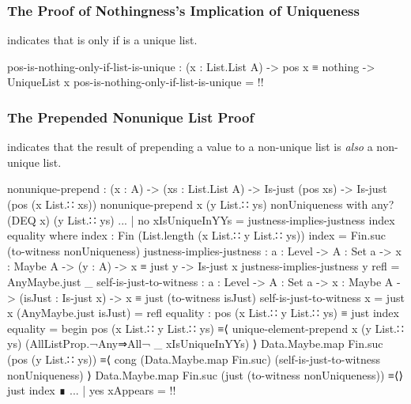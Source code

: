 \documentclass{report}
\begin{document}
\subsubsection{The Proof of Nothingness's Implication of Uniqueness}
 indicates that   is  only if  is a unique list.

\begin{code}
    pos-is-nothing-only-if-list-is-unique :
      (x : List.List A) ->
      pos x ≡ nothing ->
      UniqueList x
    pos-is-nothing-only-if-list-is-unique = {!!}
\end{code}

\subsubsection{The Prepended Nonunique List Proof}
 indicates that the result of prepending a value to a non-unique list is \emph{also} a non-unique list.

\begin{code}
    nonunique-prepend :
      (x : A) ->
      (xs : List.List A) ->
      Is-just (pos xs) ->
      Is-just (pos (x List.∷ xs))
    nonunique-prepend x (y List.∷ ys) nonUniqueness with any? (DEQ x) (y List.∷ ys)
    ... | no xIsUniqueInYYs = justness-implies-justness index equality
      where
      index : Fin (List.length (x List.∷ y List.∷ ys))
      index = Fin.suc (to-witness nonUniqueness)
      justness-implies-justness :
        {a : Level} ->
        {A : Set a} ->
        {x : Maybe A} ->
        (y : A) ->
        x ≡ just y ->
        Is-just x
      justness-implies-justness y refl = AnyMaybe.just _
      self-is-just-to-witness :
        {a : Level} ->
        {A : Set a} ->
        {x : Maybe A} ->
        (isJust : Is-just x) ->
        x ≡ just (to-witness isJust)
      self-is-just-to-witness {x = just x} (AnyMaybe.just isJust) = refl
      equality : pos (x List.∷ y List.∷ ys) ≡ just index
      equality = begin
        pos (x List.∷ y List.∷ ys)
          ≡⟨ unique-element-prepend x (y List.∷ ys)
                                    (AllListProp.¬Any⇒All¬ _ xIsUniqueInYYs) ⟩
        Data.Maybe.map Fin.suc (pos (y List.∷ ys))
          ≡⟨ cong (Data.Maybe.map Fin.suc) (self-is-just-to-witness nonUniqueness) ⟩
        Data.Maybe.map Fin.suc (just (to-witness nonUniqueness))
          ≡⟨⟩
        just index ∎
    ... | yes xAppears = {!!}
\end{code}
\end{document}
